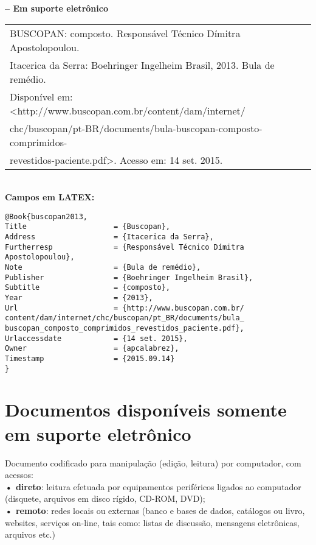 \textbf{-- Em suporte eletrônico} \\

\begin{tabular}{|l|c|} \hline
BUSCOPAN: composto. Responsável Técnico Dímitra Apostolopoulou.\\ Itacerica da Serra: Boehringer Ingelheim Brasil, 2013. Bula de remédio. \\Disponível em:<http://www.buscopan.com.br/content/dam/internet/\\chc/buscopan/pt-BR/documents/bula-buscopan-composto-comprimidos-\\revestidos-paciente.pdf>. Acesso em: 14 set. 2015.
	\\\hline
\end{tabular} \\

\textbf{Campos em LATEX:} 

\begin{verbatim}
@Book{buscopan2013,
Title                    = {Buscopan},
Address                  = {Itacerica da Serra},
Furtherresp              = {Responsável Técnico Dímitra 
Apostolopoulou},
Note                     = {Bula de remédio},
Publisher                = {Boehringer Ingelheim Brasil},
Subtitle                 = {composto},
Year                     = {2013},
Url                      = {http://www.buscopan.com.br/
content/dam/internet/chc/buscopan/pt_BR/documents/bula_
buscopan_composto_comprimidos_revestidos_paciente.pdf},
Urlaccessdate            = {14 set. 2015},
Owner                    = {apcalabrez},
Timestamp                = {2015.09.14}
}

\end{verbatim}

\section{Documentos disponíveis somente em suporte eletrônico}

Documento codificado para manipulação (edição, leitura) por computador, com acessos:\\
\textbf{• direto}: leitura efetuada por equipamentos periféricos ligados ao
computador (disquete, arquivos em disco rígido, CD-ROM, DVD);\\
\textbf{• remoto}: redes locais ou externas (banco e bases de dados,
catálogos ou livro, websites, serviços on-line, tais como: listas de
discussão, mensagens eletrônicas, arquivos etc.) \cite{Weitzc2016} \\

